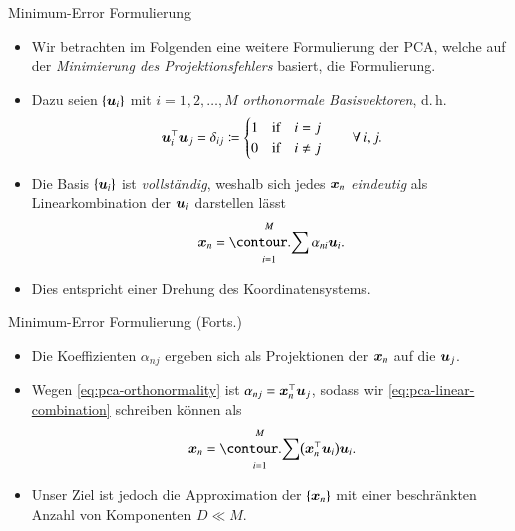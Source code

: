 \begin{frame}{Minimum-Error Formulierung}{}
	\begin{itemize}
		\item Wir betrachten im Folgenden eine weitere Formulierung der PCA, welche auf der
			\textit{Minimierung des Projektionsfehlers} basiert, die  Formulierung.
		\item Dazu seien $\{ \bm{u}_i \}$ mit $i = 1, 2, \ldots, M$ \textit{orthonormale Basisvektoren}, d.\,h.
		\begin{equation} \label{eq:pca-orthonormality}
			\bm{u}_i^\top \bm{u}_j = \delta_{ij} \coloneqq \begin{cases}
				1 & \text{if}\quad i= j 		\\
				0 & \text{if}\quad i \ne j
			\end{cases} \qquad \forall\,i, j.
		\end{equation}
		\item Die Basis $\{ \bm{u}_i \}$ ist \textit{vollständig}, weshalb sich jedes $\bm{x}_n$ \textit{eindeutig} als Linearkombination
			der $\bm{u}_i$ darstellen lässt
		\begin{equation} \label{eq:pca-linear-combination}
			\bx_n = \sum_{i=1}^M \alpha_{ni} \bu_i.
		\end{equation}
		\item Dies entspricht einer Drehung des Koordinatensystems.
	\end{itemize}
\end{frame}


\begin{frame}{Minimum-Error Formulierung (Forts.)}{}
	\begin{itemize}
		\item Die Koeffizienten $\alpha_{nj}$ ergeben sich als Projektionen der $\bm{x}_n$ auf die $\bm{u}_j$.
		\item Wegen \eqref{eq:pca-orthonormality} ist $\alpha_{nj} = \bm{x}_n^\top \bm{u}_j$, sodass wir \eqref{eq:pca-linear-combination} schreiben
			können als
		\begin{equation} \label{eq:pca-linear-combination-2}
			\bx_n = \sum_{i=1}^M \bigl( \bx_n^\top \bu_i \bigr) \bu_i.
		\end{equation}
		\item Unser Ziel ist jedoch die Approximation der $\{ \bm{x}_n \}$ mit einer beschränkten Anzahl von Komponenten $D \ll M$.
	\end{itemize}
\end{frame}


